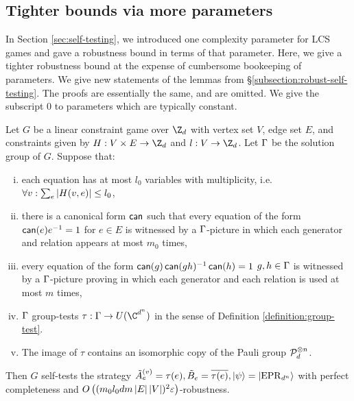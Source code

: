 \begin{appendices}
\section{Tighter bounds via more parameters}
In Section \ref{sec:self-testing}, we introduced one complexity parameter for LCS games and gave a robustness bound in terms of that parameter. Here, we give a tighter robustness bound at the expense of cumbersome bookeeping of parameters. We give new statements of the lemmas from \S \ref{subsection:robust-self-testing}. The proofs are essentially the same, and are omitted. We give the subscript $0$ to parameters which are typically constant.

\begin{theorem}
\label{thm:robust-self-testing-appendix}
	Let $G$ be a linear constraint game over $\Z_d$ with vertex set $V$, edge set $E$, and constraints given by  $H:V\times E \to \Z_d$ and $l: V\to \Z_d$. Let $\Gamma$ be the solution group of $G$. Suppose that:
	\begin{enumerate}[(i)]
		\item 
		\label{assumption:bounded-degree-appendix}
		 each equation has at most $l_0$ variables with multiplicity, i.e.\ $\forall v:\sum_e\left\vert H(v,e)\right\vert \leq l_0$,
		\item 
		
		\label{assumption:small-pictures-w-appendix}
		there is a canonical form $\operatorname*{\mathsf{can}}$ such that every equation of the form  $\operatorname*{\mathsf{can}}(e)e^{-1} = 1$ for $e\in E$ is witnessed by a $\Gamma$-picture in which each generator and relation appears at most $m_0$ times,
		\item 
		\label{assumption:small-pictures-appendix}
		 every equation of the form $\operatorname*{\mathsf{can}}(g)\operatorname*{\mathsf{can}}(gh)^{-1}\operatorname*{\mathsf{can}}(h) = 1$ $g,h\in \Gamma$ is witnessed by a $\Gamma$-picture 
		 proving in which 
		 each generator and 
		 each relation is used at most $m$ times,
		\item \label{assumption:group-test-appendix}
		 $\Gamma$ group-tests $\tau: \G \to U(\C^{d^n}) $ in the sense of Definition \ref{definition:group-test}.
		 \item \label{assumption:pauli-in-image-appendix}The image of $\tau$ contains an isomorphic copy of the Pauli group $\mathcal P_d^{\otimes n}$.
	\end{enumerate}	
Then $G$ self-tests the strategy $\tilde A_e^{(v)} = \tau(e), \tilde B_e = \overline{\tau(e)}, \ket\psi = \ket{\mathrm{EPR}_{d^n}}$
	with perfect completeness and $O\left((m_0l_0dm\left\vert E\right\vert \left\vert V\right\vert)^2 \varepsilon\right)$-robustness.
\end{theorem}



\end{appendices}
